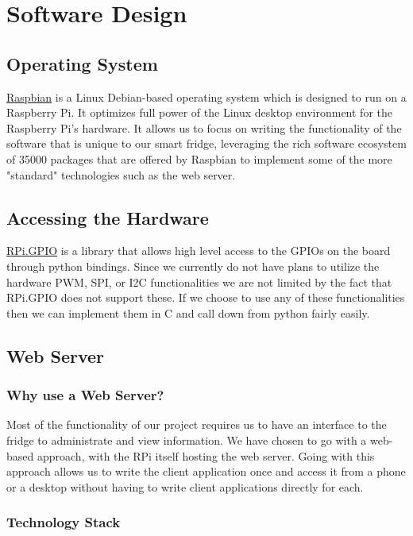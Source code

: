 \documentclass[10pt]{article}
\begin{document}
\newpage
\section{Software Design}
\subsection{Operating System}
\href{https://www.raspbian.org/}{Raspbian} is a Linux Debian-based operating system which is designed to run on a Raspberry Pi. It optimizes full power of the Linux desktop environment for the Raspberry Pi's hardware. It allows us to focus on writing the functionality of the software that is unique to our smart fridge, leveraging the rich software ecosystem of 35000 packages that are offered by Raspbian to implement some of the more "standard" technologies such as the web server.

\subsection{Accessing the Hardware}
\hyperref[https://pypi.python.org/pypi/RPi.GPIO]{RPi.GPIO} is a library that allows high level access to the GPIOs on the board through python bindings. Since we currently do not have plans to utilize the hardware PWM, SPI, or I2C functionalities we are not limited by the fact that RPi.GPIO does not support these. If we choose to use any of these functionalities then we can implement them in C and call down from python fairly easily.

\subsection{Web Server}
\subsubsection{Why use a Web Server?}

Most of the functionality of our project requires us to have an interface to the fridge to administrate and view information. We have chosen to go with a web-based approach, with the RPi itself hosting the web server. Going with this approach allows us to write the client application once and access it from a phone or a desktop without having to write client applications directly for each.

\subsubsection{Technology Stack}
\end{document}

